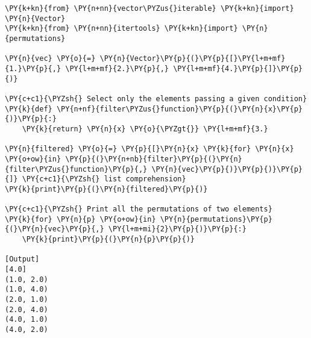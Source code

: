 \begin{Verbatim}[label=\makebox{\url{https://github.com/lucabaldini/cmepda/tree/master/slides/latex/snippets/vector\_iterable\_test.py}},commandchars=\\\{\}]
\PY{k+kn}{from} \PY{n+nn}{vector\PYZus{}iterable} \PY{k+kn}{import} \PY{n}{Vector}
\PY{k+kn}{from} \PY{n+nn}{itertools} \PY{k+kn}{import} \PY{n}{permutations}

\PY{n}{vec} \PY{o}{=} \PY{n}{Vector}\PY{p}{(}\PY{p}{[}\PY{l+m+mf}{1.}\PY{p}{,} \PY{l+m+mf}{2.}\PY{p}{,} \PY{l+m+mf}{4.}\PY{p}{]}\PY{p}{)}

\PY{c+c1}{\PYZsh{} Select only the elements passing a given condition}
\PY{k}{def} \PY{n+nf}{filter\PYZus{}function}\PY{p}{(}\PY{n}{x}\PY{p}{)}\PY{p}{:}
    \PY{k}{return} \PY{n}{x} \PY{o}{\PYZgt{}} \PY{l+m+mf}{3.}
    
\PY{n}{filtered} \PY{o}{=} \PY{p}{[}\PY{n}{x} \PY{k}{for} \PY{n}{x} \PY{o+ow}{in} \PY{p}{(}\PY{n+nb}{filter}\PY{p}{(}\PY{n}{filter\PYZus{}function}\PY{p}{,} \PY{n}{vec}\PY{p}{)}\PY{p}{)}\PY{p}{]} \PY{c+c1}{\PYZsh{} list comprehension}
\PY{k}{print}\PY{p}{(}\PY{n}{filtered}\PY{p}{)}

\PY{c+c1}{\PYZsh{} Print all the permutations of two elements}
\PY{k}{for} \PY{n}{p} \PY{o+ow}{in} \PY{n}{permutations}\PY{p}{(}\PY{n}{vec}\PY{p}{,} \PY{l+m+mi}{2}\PY{p}{)}\PY{p}{:}
    \PY{k}{print}\PY{p}{(}\PY{n}{p}\PY{p}{)}

[Output]
[4.0]
(1.0, 2.0)
(1.0, 4.0)
(2.0, 1.0)
(2.0, 4.0)
(4.0, 1.0)
(4.0, 2.0)
\end{Verbatim}